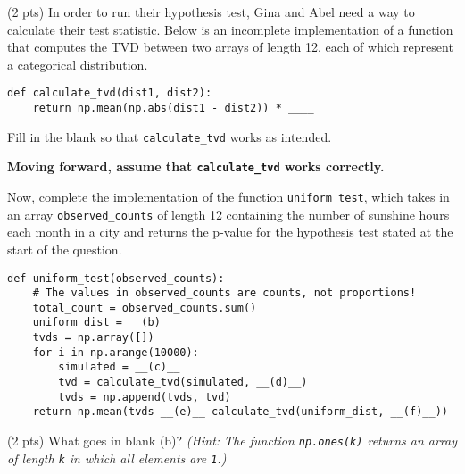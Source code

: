 \begin{prob}[(11 pts)]
\begin{subprobset}


\begin{subprob}(2 pts) In order to run their hypothesis test, Gina and Abel need a way to calculate their test statistic. Below is an incomplete implementation of a function that computes the TVD between two arrays of length 12, each of which represent a categorical distribution.

\begin{verbatim}
def calculate_tvd(dist1, dist2):
    return np.mean(np.abs(dist1 - dist2)) * ____
\end{verbatim}

Fill in the blank so that \texttt{calculate\_tvd} works as intended.


\end{subprob}

\end{subprobset}

\textbf{Moving forward, assume that \texttt{calculate\_tvd} works correctly.}

\newpage

Now, complete the implementation of the function \texttt{uniform\_test}, which takes in an array \texttt{observed\_counts} of length 12 containing the number of sunshine hours each month in a city and returns the p-value for the hypothesis test stated at the start of the question.

\begin{verbatim}
def uniform_test(observed_counts):
    # The values in observed_counts are counts, not proportions!
    total_count = observed_counts.sum()
    uniform_dist = __(b)__
    tvds = np.array([])
    for i in np.arange(10000):
        simulated = __(c)__
        tvd = calculate_tvd(simulated, __(d)__)
        tvds = np.append(tvds, tvd)
    return np.mean(tvds __(e)__ calculate_tvd(uniform_dist, __(f)__))
\end{verbatim}

\begin{subprobset}

\begin{subprob}(2 pts) What goes in blank (b)? \textit{(Hint: The function \texttt{np.ones(k)} returns an array of length \texttt{k} in which all elements are \texttt{1}.)}


\end{subprob}
\end{subprobset}
\end{prob}
